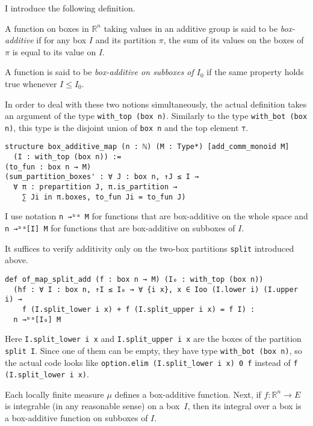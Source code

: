 \documentclass[a4paper, UKenglish,cleveref, autoref, thm-restate]{lipics-v2021}
\newcommand{\bbR}{\mathbb{R}}
\begin{document}
I introduce the following definition.

\begin{definition}
  A function on boxes in \(\bbR^{n}\) taking values in an additive
  group is said to be \emph{box-additive} if for any box \(I\) and its
  partition \(\pi\), the sum of its values on the boxes of \(\pi\) is
  equal to its value on \(I\).

  A function is said to be \emph{box-additive on subboxes of
    \(I_{0}\)} if the same property holds true whenever \(I\le I_{0}\).
\end{definition}

In order to deal with these two notions simultaneously, the actual
definition takes an argument of the type
\lstinline=with_top (box n)=. Similarly to the type
\lstinline=with_bot (box n)=, this type is the disjoint union of
\lstinline=box n= and the top element \lstinline=⊤=.

\begin{lstlisting}[caption=Definition of a box additive function,label={lst:box-additive}]
structure box_additive_map (n : ℕ) (M : Type*) [add_comm_monoid M]
  (I : with_top (box n)) :=
(to_fun : box n → M)
(sum_partition_boxes' : ∀ J : box n, ↑J ≤ I →
  ∀ π : prepartition J, π.is_partition →
    ∑ Ji in π.boxes, to_fun Ji = to_fun J)
\end{lstlisting}

I use notation \lstinline=n →ᵇᵃ M= for functions that are box-additive
on the whole space and \lstinline=n →ᵇᵃ[I] M= for functions that are
box-additive on subboxes of \(I\).

It suffices to verify additivity only on the two-box partitions
\lstinline=split= introduced above.
\begin{lstlisting}
def of_map_split_add (f : box n → M) (I₀ : with_top (box n))
  (hf : ∀ I : box n, ↑I ≤ I₀ → ∀ {i x}, x ∈ Ioo (I.lower i) (I.upper i) →
    f (I.split_lower i x) + f (I.split_upper i x) = f I) :
  n →ᵇᵃ[I₀] M
\end{lstlisting}

Here \lstinline=I.split_lower i x= and \lstinline=I.split_upper i x=
are the boxes of the partition \lstinline=split I=. Since one of them
can be empty, they have type \lstinline=with_bot (box n)=, so the
actual code looks like \lstinline=option.elim (I.split_lower i x) 0 f=
instead of \lstinline=f (I.split_lower i x)=.

Each locally finite measure \(\mu\) defines a box-additive function.
Next, if \(f\colon\bbR^{n}\to E\) is integrable (in any reasonable
sense) on a box~\(I\), then its integral over a box is a box-additive
function on subboxes of \(I\).
\end{document}
